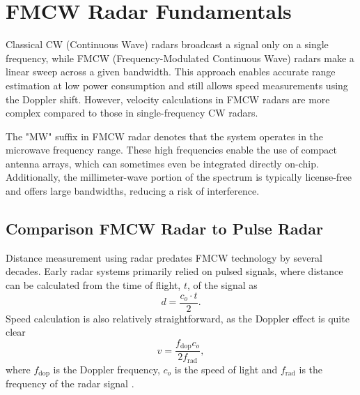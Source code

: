 \def\PageLayout{single-no-print}
\def\DocLanguage{en}
\def\PackagesIncludeTikz{yes}
\def\PackagesIncludeBib{yes}









\usepackage{pdfpages}

\newcommand{\sidar}{SiRad Easy\textsuperscript{\copyright} }
\newcommand{\boldred}[1]{\textbf{\textcolor{red}{#1}}}
\newcommand{\boldblue}[1]{\textbf{\textcolor{blue}{#1}}}






\tableofcontents

\newpage
{}
\setcounter{page}{1}





\pagestyle{fancy}

\chapter{FMCW Radar Fundamentals}

Classical CW (Continuous Wave) radars broadcast a signal only on a single frequency, while FMCW (Frequency-Modulated Continuous Wave) radars make a linear sweep across a given bandwidth.
This approach enables accurate range estimation at low power consumption and still allows speed measurements using the Doppler shift.
However, velocity calculations in FMCW radars are more complex compared to those in single-frequency CW radars.

The "MW" suffix in FMCW radar denotes that the system operates in the microwave frequency range.
These high frequencies enable the use of compact antenna arrays, which can sometimes even be integrated directly on-chip.
Additionally, the millimeter-wave portion of the spectrum is typically license-free \cite{spektrumCTU} and offers large bandwidths, reducing a risk of interference.

\section{Comparison FMCW Radar to Pulse Radar}

Distance measurement using radar predates FMCW technology by several decades.
Early radar systems primarily relied on pulsed signals, where distance can be calculated from the time of flight, $t$, of the signal as
\begin{equation}
  d = \frac{c_o \cdot t}{2}.
  \label{eq:distance}
\end{equation}
Speed calculation is also relatively straightforward, as the Doppler effect is quite clear
\begin{equation}
  v = \frac{f_\mathrm{dop} c_o}{2f_\mathrm{rad}},
  \label{eq:dopler}
\end{equation}
where $f_\mathrm{dop}$ is the Doppler frequency, $c_o$ is the speed of light and $f_\mathrm{rad}$ is the frequency of the radar signal \cite{jankiraman2018}.

